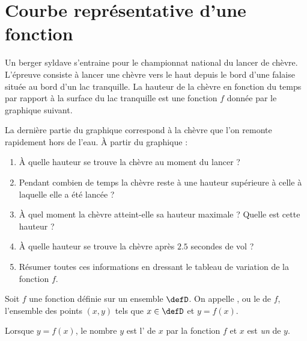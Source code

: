 
\section{Courbe représentative d'une fonction}

\begin{Aprojeter}
    
    Un berger syldave s'entraine pour le championnat national du lancer de chèvre. L'épreuve consiste à lancer une chèvre vers le haut depuis le bord d'une falaise située au bord d'un lac tranquille. La hauteur de la chèvre en fonction du temps par rapport à la surface du lac tranquille est une fonction \( f\) donnée par le graphique suivant.

    \begin{center}
        
    \end{center}
    La dernière partie du graphique correspond à la chèvre que l'on remonte rapidement hors de l'eau.
    À partir du graphique :
    \begin{enumerate}
        \item
            À quelle hauteur se trouve la chèvre au moment du lancer ?
        \item
            Pendant combien de temps la chèvre reste à une hauteur supérieure à celle à laquelle elle a été lancée ?
        \item
            À quel moment la chèvre atteint-elle sa hauteur maximale ? Quelle est cette hauteur ?
        \item
            À quelle hauteur se trouve la chèvre après \( 2.5\) secondes de vol ?
        \item
            Résumer toutes ces informations en dressant le tableau de variation de la fonction \( f\).
    \end{enumerate}
\end{Aprojeter}


\begin{definition}
Soit $f$ une fonction définie sur un ensemble $\defD$.
    On appelle , ou le  de $f$, l'ensemble des points $(x,y)$ tels que $x\in\defD$ et $y=f(x)$.

    Lorsque \( y=f(x)\), le nombre \( y\) est l' de \( x\) par la fonction \( f\) et \( x\) est \emph{un}  de \( y\).
\end{definition}

